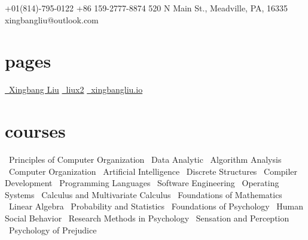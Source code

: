 \documentclass[]{friggeri-cv}
\begin{document}
       {
       \faMobilePhone\hspace{1mm} +01(814)-795-0122 \hspace{0.1cm} 			   \faMobilePhone\hspace{1mm} +86 159-2777-8874 \hspace{0.1cm}
       520 N Main St., Meadville, PA, 16335 \hspace{0.1cm} 					\faEnvelope\hspace{1.5mm}xingbangliu@outlook.com
       }

\begin{aside}
  \section{pages}\vspace{0.05cm}
    \href{https://www.linkedin.com/in/liux2}{\faLinkedin\ Xingbang Liu}\vspace{0.03cm}
    \href{https://github.com/liux2}{\faGithub\ liux2}\vspace{0.03cm}
    \href{https://xingbangliu.io/}{\faGlobe\ xingbangliu.io}\vspace{0.03cm}
  \section{courses}\vspace{0.05cm}
  \bullet\ Principles of Computer Organization\vspace{0.1cm}
  \bullet\ Data Analytic\vspace{0.1cm}
  \bullet\ Algorithm Analysis\vspace{0.1cm}
  \bullet\ Computer Organization\vspace{0.1cm}
  \bullet\ Artificial Intelligence\vspace{0.1cm}
  \bullet\ Discrete Structures\vspace{0.1cm}
  \bullet\ Compiler Development\vspace{0.1cm}
  \bullet\ Programming Languages\vspace{0.1cm}
  \bullet\ Software Engineering\vspace{0.1cm}
  \bullet\ Operating Systems\vspace{0.3cm}
  \bullet\ Calculus and Multivariate Calculus \vspace{0.1cm}
  \bullet\ Foundations of Mathematics\vspace{0.1cm}
  \bullet\ Linear Algebra\vspace{0.1cm}
  \bullet\ Probability and Statistics\vspace{0.3cm}
  \bullet\ Foundations of Psychology\vspace{0.1cm}
  \bullet\ Human Social Behavior\vspace{0.1cm}
  \bullet\ Research Methods in Psychology\vspace{0.1cm}
  \bullet\ Sensation and Perception\vspace{0.1cm}
  \bullet\ Psychology of Prejudice\vspace{0.1cm}

\end{aside}
\end{document}
